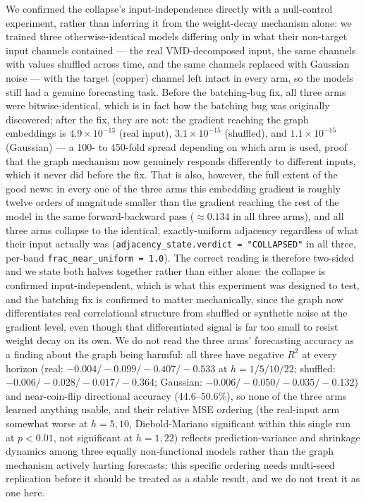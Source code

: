 \documentclass[journal]{IEEEtran}
\begin{document}
We confirmed the collapse's input-independence directly with a null-control experiment, rather than inferring it from the weight-decay mechanism alone: we trained three otherwise-identical models differing only in what their non-target input channels contained --- the real VMD-decomposed input, the same channels with values shuffled across time, and the same channels replaced with Gaussian noise --- with the target (copper) channel left intact in every arm, so the models still had a genuine forecasting task. Before the batching-bug fix, all three arms were bitwise-identical, which is in fact how the batching bug was originally discovered; after the fix, they are not: the gradient reaching the graph embeddings is $4.9\times10^{-13}$ (real input), $3.1\times10^{-15}$ (shuffled), and $1.1\times10^{-15}$ (Gaussian) --- a 100- to 450-fold spread depending on which arm is used, proof that the graph mechanism now genuinely responds differently to different inputs, which it never did before the fix. That is also, however, the full extent of the good news: in every one of the three arms this embedding gradient is roughly twelve orders of magnitude smaller than the gradient reaching the rest of the model in the same forward-backward pass ($\approx 0.134$ in all three arms), and all three arms collapse to the identical, exactly-uniform adjacency regardless of what their input actually was (\texttt{adjacency\_state.verdict = "COLLAPSED"} in all three, per-band \texttt{frac\_near\_uniform = 1.0}). The correct reading is therefore two-sided and we state both halves together rather than either alone: the collapse is confirmed input-independent, which is what this experiment was designed to test, and the batching fix is confirmed to matter mechanically, since the graph now differentiates real correlational structure from shuffled or synthetic noise at the gradient level, even though that differentiated signal is far too small to resist weight decay on its own. We do not read the three arms' forecasting accuracy as a finding about the graph being harmful: all three have negative $R^2$ at every horizon (real: $-0.004/-0.099/-0.407/-0.533$ at $h=1/5/10/22$; shuffled: $-0.006/-0.028/-0.017/-0.364$; Gaussian: $-0.006/-0.050/-0.035/-0.132$) and near-coin-flip directional accuracy (44.6--50.6\%), so none of the three arms learned anything usable, and their relative MSE ordering (the real-input arm somewhat worse at $h=5,10$, Diebold-Mariano significant within this single run at $p<0.01$, not significant at $h=1,22$) reflects prediction-variance and shrinkage dynamics among three equally non-functional models rather than the graph mechanism actively hurting forecasts; this specific ordering needs multi-seed replication before it should be treated as a stable result, and we do not treat it as one here.
\end{document}
